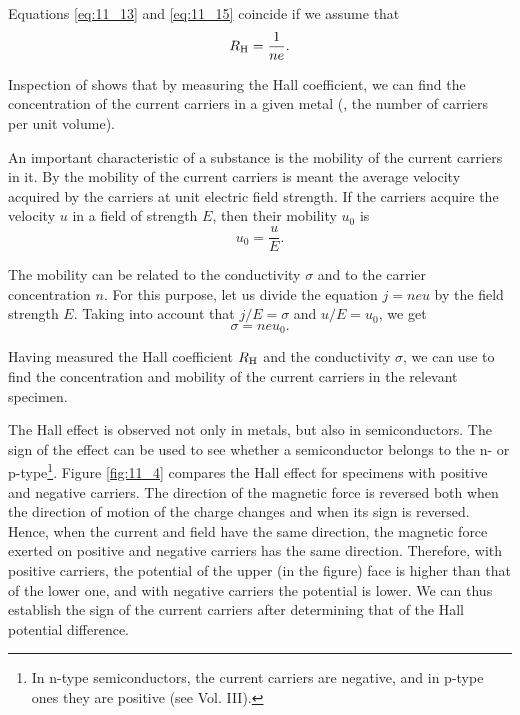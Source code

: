 \noindent
Equations \eqref{eq:11_13} and \eqref{eq:11_15} coincide if we assume that
\begin{equation}\label{eq:11_16}
    R_{\text{H}} = \frac{1}{ne}.
\end{equation}

Inspection of  shows that by measuring the Hall coefficient, we can find the concentration of the current carriers in a given metal (\ie, the number of carriers per unit volume).

An important characteristic of a substance is the mobility of the current carriers in it.
By the mobility of the current carriers is meant the average velocity acquired by the carriers at unit electric field strength.
If the carriers acquire the velocity $u$ in a field of strength $E$, then their mobility $u_0$ is
\begin{equation}\label{eq:11_17}
    u_0 = \frac{u}{E}.
\end{equation}

\noindent
The mobility can be related to the conductivity $\sigma$ and to the carrier concentration $n$.
For this purpose, let us divide the equation $j=neu$ by the field strength $E$.
Taking into account that $j/E=\sigma$ and $u/E=u_0$, we get
\begin{equation}\label{eq:11_18}
    \sigma = ne u_0.
\end{equation}

Having measured the Hall coefficient $R_{\text{H}}$ and the conductivity $\sigma$, we can use  to find the concentration and
mobility of the current carriers in the relevant specimen.

The Hall effect is observed not only in metals, but also in semiconductors.
The sign of the effect can be used to see whether a semiconductor belongs to the n- or p-type\footnote{In n-type semiconductors, the current carriers are negative, and in p-type ones they are positive (see Vol. III).}.
Figure \ref{fig:11_4} compares the Hall effect for specimens with positive and negative carriers.
The direction of the magnetic force is reversed both when the direction of motion of the charge changes and when its sign is reversed.
Hence, when the current and field have the same direction, the magnetic force exerted on positive and negative carriers has the same direction.
Therefore, with positive carriers, the potential of the upper (in the figure) face is higher than that of the lower one, and with negative carriers the potential is lower.
We can thus establish the sign of the current carriers after determining that of the Hall potential difference.

